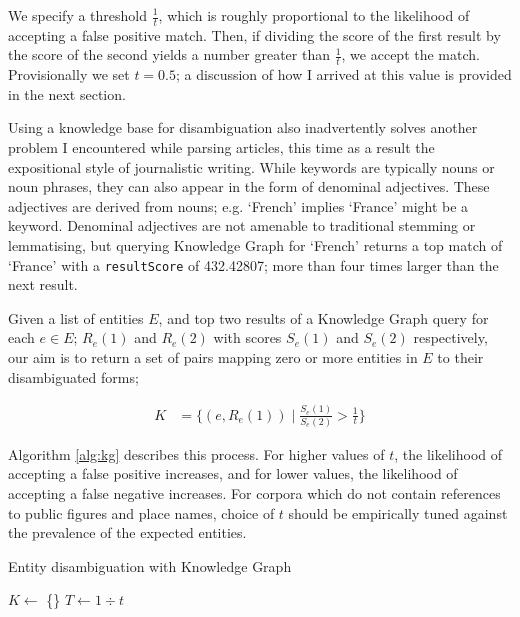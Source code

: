We specify a threshold $\frac{1}{t}$, which is roughly proportional to the likelihood of accepting a false positive match. Then, if dividing the score of the first result by the score of the second yields a number greater than $\frac{1}{t}$, we accept the match. Provisionally we set $t=0.5$; a discussion of how I arrived at this value is provided in the next section.

Using a knowledge base for disambiguation also inadvertently solves another problem I encountered while parsing articles, this time as a result the expositional style of journalistic writing. While keywords are typically nouns or noun phrases, they can also appear in the form of denominal adjectives. These adjectives are derived from nouns; e.g. `French' implies `France' might be a keyword. Denominal adjectives are not amenable to traditional stemming or lemmatising, but querying Knowledge Graph for `French' returns a top match of `France' with a \texttt{resultScore} of 432.42807; more than four times larger than the next result.

Given a list of entities $E$, and top two results of a Knowledge Graph query for each $e \in E$; $R_e(1)$ and $R_e(2)$ with scores $S_e(1)$ and $S_e(2)$ respectively, our aim is to return a set of pairs mapping zero or more entities in $E$ to their disambiguated forms;

\begin{align*}
K &= \bigg\{(e, R_e(1))\;|\;\frac{S_e(1)}{S_e(2)} > \frac{1}{t}\bigg\}
\end{align*}

Algorithm \ref{alg:kg} describes this process. For higher values of $t$, the likelihood of accepting a false positive increases, and for lower values, the likelihood of accepting a false negative increases. For corpora which do not contain references to public figures and place names, choice of $t$ should be empirically tuned against the prevalence of the expected entities.

\begin{algorithm}
\label{alg:kg}
 \caption{Entity disambiguation with Knowledge Graph}
 $K \gets$ \{\}\;
 $T \gets 1\div{t}$\;
\end{algorithm}

